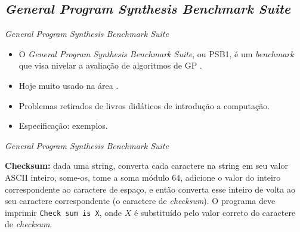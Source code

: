 \subsection{\textit{General Program Synthesis Benchmark Suite}}
\begin{frame}{\textit{General Program Synthesis Benchmark Suite}}
  \begin{itemize}
    \item O \textit{General Program Synthesis Benchmark Suite}, ou PSB1,
      é um \textit{benchmark} que visa nivelar a avaliação de algoritmos de GP \cite{psb1}.
    \item Hoje muito usado na área \cite{psb2}.
    \item Problemas retirados de livros didáticos de introdução a computação.
    \item Especificação: exemplos.
  \end{itemize}
\end{frame}
\begin{frame}{\textit{General Program Synthesis Benchmark Suite}}
  \begin{examples}
    \textbf{Checksum:} dada uma string, converta cada caractere na string em
    seu valor ASCII inteiro, some-os, tome a soma módulo $64$,
    adicione o valor do inteiro correspondente ao caractere de espaço,
    e então converta esse inteiro de volta ao seu caractere correspondente
    (o caractere de \textit{checksum}).
    O programa deve imprimir \texttt{Check sum is X},
    onde $X$ é substituído pelo valor correto do caractere de \textit{checksum}.
  \end{examples}
\end{frame}
